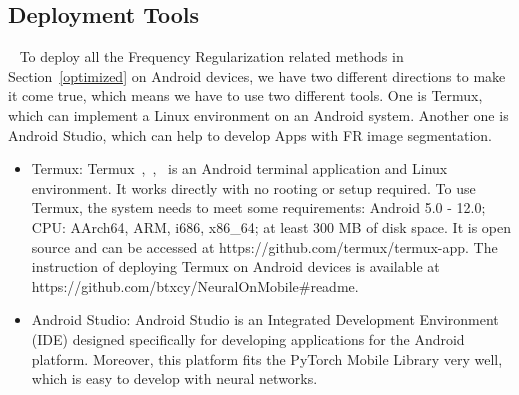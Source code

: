 \documentclass[runningheads]{llncs}
\begin{document}
\subsection{Deployment Tools}~\label{deployment}
To deploy all the Frequency Regularization related methods in Section~\ref{optimized} on Android devices, we have two different directions to make it come true, which means we have to use two different tools. One is Termux, which can implement a Linux environment on an Android system. Another one is Android Studio, which can help to develop Apps with FR image segmentation.
\begin{itemize}
	\item Termux: Termux~\cite{termux_repo},~\cite{termux_overview},~\cite{termux_wiki}  is an Android terminal application and Linux environment. It works directly with no rooting or setup required. To use Termux, the system needs to meet some requirements: Android 5.0 - 12.0; CPU: AArch64, ARM, i686, x86\_64; at least 300 MB of disk space. It is open source and can be accessed at https://github.com/termux/termux-app. The instruction of deploying Termux on Android devices is available at https://github.com/btxcy/NeuralOnMobile\#readme. 
	\item Android Studio: Android Studio is an Integrated Development Environment (IDE) designed specifically for developing applications for the Android platform. Moreover, this platform fits the PyTorch Mobile Library very well, which is easy to develop with neural networks.
\end{itemize}	 		
\end{document}
